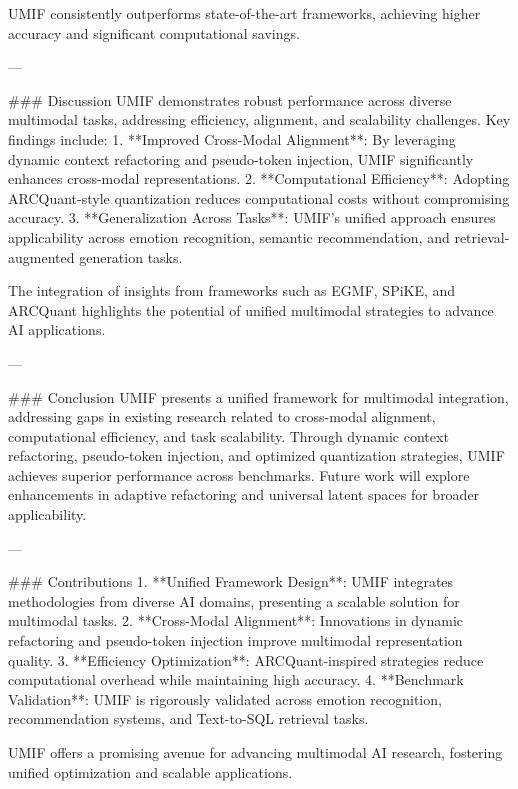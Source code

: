 UMIF consistently outperforms state-of-the-art frameworks, achieving higher accuracy and significant computational savings.  

---

### Discussion  
UMIF demonstrates robust performance across diverse multimodal tasks, addressing efficiency, alignment, and scalability challenges. Key findings include:  
1. **Improved Cross-Modal Alignment**: By leveraging dynamic context refactoring and pseudo-token injection, UMIF significantly enhances cross-modal representations.  
2. **Computational Efficiency**: Adopting ARCQuant-style quantization reduces computational costs without compromising accuracy.  
3. **Generalization Across Tasks**: UMIF's unified approach ensures applicability across emotion recognition, semantic recommendation, and retrieval-augmented generation tasks.  

The integration of insights from frameworks such as EGMF, SPiKE, and ARCQuant highlights the potential of unified multimodal strategies to advance AI applications.  

---

### Conclusion  
UMIF presents a unified framework for multimodal integration, addressing gaps in existing research related to cross-modal alignment, computational efficiency, and task scalability. Through dynamic context refactoring, pseudo-token injection, and optimized quantization strategies, UMIF achieves superior performance across benchmarks. Future work will explore enhancements in adaptive refactoring and universal latent spaces for broader applicability.  

---

### Contributions  
1. **Unified Framework Design**: UMIF integrates methodologies from diverse AI domains, presenting a scalable solution for multimodal tasks.  
2. **Cross-Modal Alignment**: Innovations in dynamic refactoring and pseudo-token injection improve multimodal representation quality.  
3. **Efficiency Optimization**: ARCQuant-inspired strategies reduce computational overhead while maintaining high accuracy.  
4. **Benchmark Validation**: UMIF is rigorously validated across emotion recognition, recommendation systems, and Text-to-SQL retrieval tasks.  

UMIF offers a promising avenue for advancing multimodal AI research, fostering unified optimization and scalable applications.